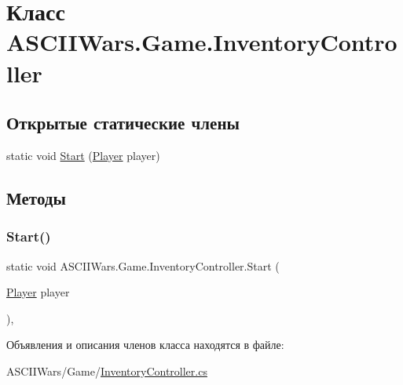 \hypertarget{class_a_s_c_i_i_wars_1_1_game_1_1_inventory_controller}{}\section{Класс A\+S\+C\+I\+I\+Wars.\+Game.\+Inventory\+Controller}
\label{class_a_s_c_i_i_wars_1_1_game_1_1_inventory_controller}
\subsection*{Открытые статические члены}
\begin{DoxyCompactItemize}
\item 
static void \hyperlink{class_a_s_c_i_i_wars_1_1_game_1_1_inventory_controller_a7cf0556bdbb8dd155a09050d81110f1e}{Start} (\hyperlink{class_a_s_c_i_i_wars_1_1_game_1_1_player}{Player} player)
\end{DoxyCompactItemize}


\subsection{Методы}
\hypertarget{class_a_s_c_i_i_wars_1_1_game_1_1_inventory_controller_a7cf0556bdbb8dd155a09050d81110f1e}{}\label{class_a_s_c_i_i_wars_1_1_game_1_1_inventory_controller_a7cf0556bdbb8dd155a09050d81110f1e} 
\subsubsection{\texorpdfstring{Start()}{Start()}}
{\footnotesize\ttfamily static void A\+S\+C\+I\+I\+Wars.\+Game.\+Inventory\+Controller.\+Start (\begin{DoxyParamCaption}\item[{\hyperlink{class_a_s_c_i_i_wars_1_1_game_1_1_player}{Player}}]{player }\end{DoxyParamCaption})\hspace{0.3cm}{\ttfamily [inline]}, {\ttfamily [static]}}



Объявления и описания членов класса находятся в файле\+:\begin{DoxyCompactItemize}
\item 
A\+S\+C\+I\+I\+Wars/\+Game/\hyperlink{_inventory_controller_8cs}{Inventory\+Controller.\+cs}\end{DoxyCompactItemize}
